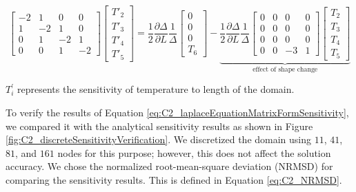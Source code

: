 \begin{equation}\label{eq:C2_laplaceEquationMatrixFormSensitivity}
    \begin{bmatrix}
        -2 & 1 & 0 & 0 \\
        1 & -2 & 1 & 0 \\
        0 & 1 & -2 & 1 \\
        0 & 0 & 1 & -2
    \end{bmatrix}
    \begin{bmatrix}
        T'_2 \\
        T'_3 \\
        T'_4 \\
        T'_5
    \end{bmatrix}
    =
    \frac{1}{2} \frac{\partial \Delta}{\partial L} \frac{1}{\Delta}
    \begin{bmatrix}
        0 \\
        0 \\
        0 \\
        T_6
    \end{bmatrix}
    -
    \underbrace{
    \frac{1}{2} \frac{\partial \Delta}{\partial L} \frac{1}{\Delta}
    \begin{bmatrix}
        0 & 0 & 0 & 0 \\
        0 & 0 & 0 & 0 \\
        0 & 0 & 0 & 0 \\
        0 & 0 & -3 & 1
    \end{bmatrix}
    \begin{bmatrix}
        T_2 \\
        T_3 \\
        T_4 \\
        T_5
    \end{bmatrix}}_\text{effect of shape change}
\end{equation}

$T^\prime_i$ represents the sensitivity of temperature to length of the domain.

To verify the results of Equation \eqref{eq:C2_laplaceEquationMatrixFormSensitivity}, we compared it with the analytical sensitivity results as shown in Figure \ref{fig:C2_discreteSensitivityVerification}. We discretized the domain using $11$, $41$, $81$, and $161$ nodes for this purpose; however, this does not affect the solution accuracy. We chose the normalized root-mean-square deviation (NRMSD) for comparing the sensitivity results. This is defined in Equation \eqref{eq:C2_NRMSD}.

